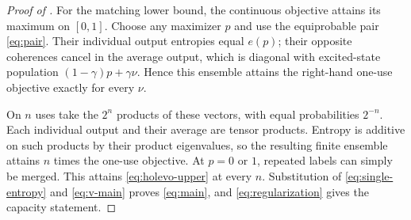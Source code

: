\begin{proof}[Proof of ]
For the matching lower bound, the continuous objective attains its
maximum on $[0,1]$. Choose any maximizer $p$ and use the equiprobable
pair \eqref{eq:pair}. Their individual output entropies equal $e(p)$;
their opposite coherences cancel in the
average output, which is diagonal with excited-state population
$(1-\gamma)p+\gamma\nu$. Hence this ensemble attains the right-hand
one-use objective exactly for every $\nu$.

On $n$ uses take the $2^n$ products of these vectors, with equal
probabilities $2^{-n}$. Each individual output and their average are
tensor products. Entropy is additive on such products by their product
eigenvalues, so the resulting finite ensemble attains $n$ times the
one-use objective. At $p=0$ or $1$, repeated labels can simply be
merged. This attains \eqref{eq:holevo-upper} at every $n$. Substitution
of \eqref{eq:single-entropy} and \eqref{eq:v-main} proves
\eqref{eq:main}, and \eqref{eq:regularization} gives the capacity
statement.
\end{proof}
